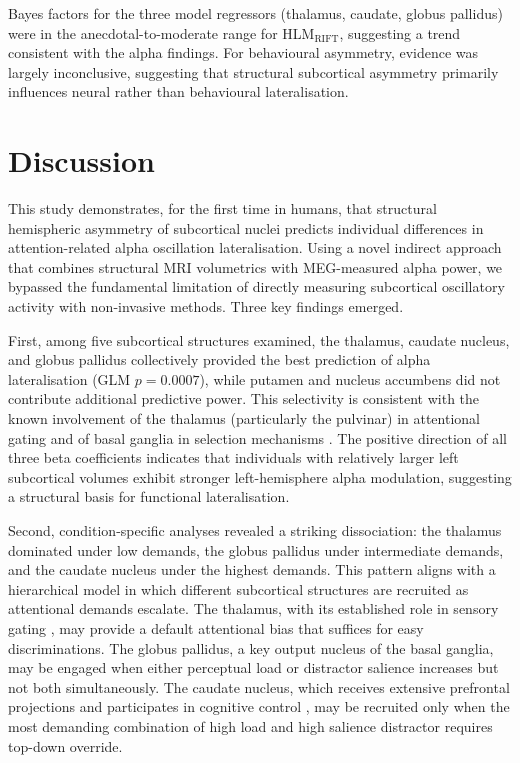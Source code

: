 \documentclass[11pt]{article}
\begin{document}
Bayes factors for the three model regressors (thalamus, caudate, globus pallidus) were in the anecdotal-to-moderate range for HLM$_\text{RIFT}$, suggesting a trend consistent with the alpha findings. For behavioural asymmetry, evidence was largely inconclusive, suggesting that structural subcortical asymmetry primarily influences neural rather than behavioural lateralisation.

\section{Discussion}

This study demonstrates, for the first time in humans, that structural hemispheric asymmetry of subcortical nuclei predicts individual differences in attention-related alpha oscillation lateralisation. Using a novel indirect approach that combines structural MRI volumetrics with MEG-measured alpha power, we bypassed the fundamental limitation of directly measuring subcortical oscillatory activity with non-invasive methods. Three key findings emerged.

First, among five subcortical structures examined, the thalamus, caudate nucleus, and globus pallidus collectively provided the best prediction of alpha lateralisation (GLM $p = 0.0007$), while putamen and nucleus accumbens did not contribute additional predictive power. This selectivity is consistent with the known involvement of the thalamus (particularly the pulvinar) in attentional gating \citep{saalmann2012neural, mcalonan2008guarding} and of basal ganglia in selection mechanisms \citep{lanciego2012functional, desimone1995neural}. The positive direction of all three beta coefficients indicates that individuals with relatively larger left subcortical volumes exhibit stronger left-hemisphere alpha modulation, suggesting a structural basis for functional lateralisation.

Second, condition-specific analyses revealed a striking dissociation: the thalamus dominated under low demands, the globus pallidus under intermediate demands, and the caudate nucleus under the highest demands. This pattern aligns with a hierarchical model in which different subcortical structures are recruited as attentional demands escalate. The thalamus, with its established role in sensory gating \citep{saalmann2011cognitive}, may provide a default attentional bias that suffices for easy discriminations. The globus pallidus, a key output nucleus of the basal ganglia, may be engaged when either perceptual load or distractor salience increases but not both simultaneously. The caudate nucleus, which receives extensive prefrontal projections and participates in cognitive control \citep{lanciego2012functional}, may be recruited only when the most demanding combination of high load and high salience distractor requires top-down override.
\end{document}

